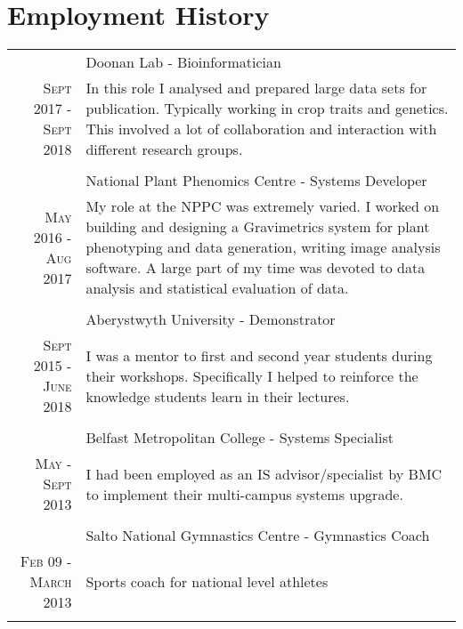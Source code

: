 \documentclass[a4paper,10pt]{article}
\begin{document}
\section{Employment History}
  \begin{longtable}{r|p{9cm}}

    &Doonan Lab - Bioinformatician \\\textsc{Sept 2017 - Sept 2018}
    &\footnotesize{In this role I analysed and prepared large data sets for publication. Typically working in crop traits and genetics. This involved a lot of collaboration and interaction with different research groups.}\\\multicolumn{2}{c}{} \\

    &National Plant Phenomics Centre -  Systems Developer \\\textsc{May 2016 - Aug 2017}
    &\footnotesize{My role at the NPPC was extremely varied. I worked on building and designing a Gravimetrics system for plant phenotyping and data generation, writing image analysis software. A large part of my time was devoted to data analysis and statistical evaluation of data.}\\\multicolumn{2}{c}{} \\


    &Aberystwyth University -  Demonstrator \\ \textsc{Sept 2015 - June 2018}
    &\footnotesize{I was a mentor to first and second year students during their workshops. Specifically I helped to reinforce the knowledge students learn in their lectures.}\\\multicolumn{2}{c}{} \\

    &Belfast Metropolitan College - Systems Specialist \\\textsc{May - Sept 2013}
    &\footnotesize{I had been employed as an IS advisor/specialist by BMC to implement their multi-campus systems upgrade.}\\\multicolumn{2}{c}{} \\

    &Salto National Gymnastics Centre - Gymnastics Coach \\\textsc{Feb 09 - March 2013}
     & \footnotesize{Sports coach for national level athletes}\\\multicolumn{2}{c}{} \\
  \end{longtable}
\end{document}
